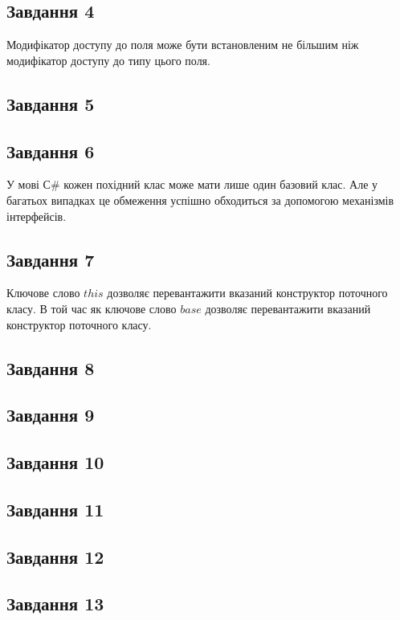 \documentclass[oneside,14pt]{extarticle}
\begin{document}
\begin{normalsize}
	\subsection*{Завдання 4}
	Модифікатор доступу до поля може бути встановленим не більшим ніж модифікатор доступу до типу цього поля.
	
	\subsection*{Завдання 5}
	
	\subsection*{Завдання 6}
	У мові С\# кожен похідний клас може мати лише один базовий клас. Але у багатьох
	випадках це обмеження успішно обходиться за допомогою механізмів інтерфейсів.
	
	\subsection*{Завдання 7}
	Ключове слово $this$ дозволяє перевантажити вказаний конструктор поточного класу. В той час як ключове слово $base$ дозволяє перевантажити вказаний конструктор поточного класу.
	
	\subsection*{Завдання 8}
	
	\subsection*{Завдання 9}
	
	\subsection*{Завдання 10}
	
	\subsection*{Завдання 11}
	
	\subsection*{Завдання 12}
	
	\subsection*{Завдання 13}
	

\end{normalsize}
\end{document}
